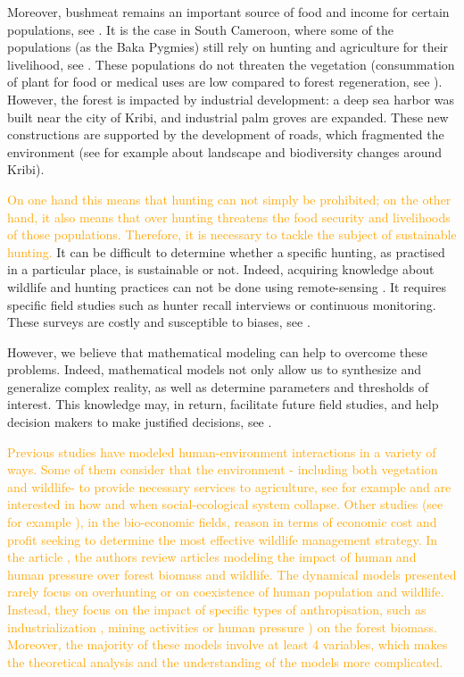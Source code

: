 \documentclass{article}
\newcommand{\vdeux}[1]{\textcolor{orange}{#1}}
\newcommand{\vtrois}[1]{\textcolor{OliveGreen}{#1}}
\theoremstyle{definition}
\theoremstyle{remark}
\begin{document}
Moreover, bushmeat remains an important source of food and income for certain populations, see \cite{jones_incentives_2019}. \vtrois{It is the case in South Cameroon, where some of the populations (as the Baka Pygmies) still rely on hunting and agriculture for their livelihood, see \cite{avila_martin_food_2024}. These populations do not threaten the vegetation (consummation of plant for food or medical uses are low compared to forest regeneration, see \cite{koppert_consommation_1996}). However, the forest is impacted by industrial development: a deep sea harbor was built near the city of Kribi, and industrial palm groves are expanded. These new constructions are supported by the development of roads, which fragmented the environment (see for example \cite{foonde_change_2018, romain_deforestation_2017} about landscape and biodiversity changes around Kribi).
}

\vdeux{
On one hand this means that hunting can not simply be prohibited; on the other hand, it also means that over hunting threatens the food security and livelihoods of those populations. Therefore, it is necessary to tackle the subject of sustainable hunting.
}
It can be difficult to determine whether a specific hunting, as practised in a particular place, is sustainable or not. Indeed, acquiring knowledge about wildlife and hunting practices can not be done using remote-sensing \cite{peres_detecting_2006}. It requires specific field studies such as hunter recall interviews or continuous monitoring. These surveys are costly and susceptible to biases, see \cite{jones_consequences_2020}.

However, we believe that mathematical modeling can help to overcome these problems. Indeed, mathematical models not only allow us to synthesize and generalize complex reality, as well as determine parameters and thresholds of interest. This knowledge may, in return, facilitate future field studies, and help decision makers to make justified decisions, see \cite{deangelis_towards_2021}.

\vdeux{
Previous studies have modeled human-environment interactions in a variety of ways.
Some of them consider that the environment - including both vegetation and wildlife- to provide necessary services to agriculture, see for example \cite{bengochea-paz_agricultural_2020, roman_dynamics_2018} and are interested in how and when social-ecological system collapse. Other studies (see for example \cite{bulte_habitat_2003, nlom_bio-economic_2021}), in the bio-economic fields, reason in terms of economic cost and profit seeking to determine the most effective wildlife management strategy. In the article \cite{fanuel_modelling_2023}, the authors review articles modeling the impact of human and human pressure over forest biomass and wildlife. The dynamical models presented rarely focus on overhunting or on coexistence of human population and wildlife. Instead, they focus on the impact of specific types of anthropisation, such as industrialization \cite{agarwal_depletion_2010}, mining activities or human pressure \cite{dubey_modelling_2009}) on the forest biomass. Moreover, the majority of these models involve at least 4 variables, which makes the theoretical analysis and the understanding of the models more complicated.
}
\end{document}
